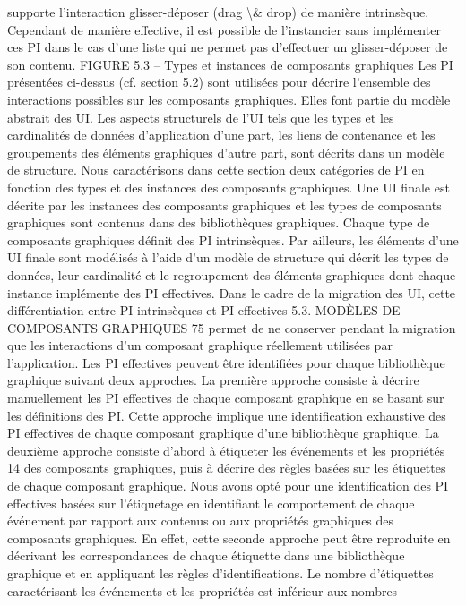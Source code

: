 \documentclass{article}
\begin{document}
supporte l’interaction glisser-d\'{e}poser (drag \textbackslash{}& drop) de mani\`{e}re intrins\`{e}que. Cependant de mani\`{e}re
effective, il est possible de l’instancier sans impl\'{e}menter ces PI dans le cas d’une liste qui ne permet
pas d’effectuer un glisser-d\'{e}poser de son contenu.
FIGURE 5.3 – Types et instances de composants graphiques
Les PI pr\'{e}sent\'{e}es ci-dessus (cf. section 5.2) sont utilis\'{e}es pour d\'{e}crire l’ensemble des interactions
possibles sur les composants graphiques. Elles font partie du mod\`{e}le abstrait des UI. Les aspects
structurels de l’UI tels que les types et les cardinalit\'{e}s de donn\'{e}es d’application d’une part, les liens
de contenance et les groupements des \'{e}l\'{e}ments graphiques d’autre part, sont d\'{e}crits dans un mod\`{e}le
de structure. Nous caract\'{e}risons dans cette section deux cat\'{e}gories de PI en fonction des types et
des instances des composants graphiques. Une UI ﬁnale est d\'{e}crite par les instances des composants
graphiques et les types de composants graphiques sont contenus dans des biblioth\`{e}ques graphiques.
Chaque type de composants graphiques d\'{e}ﬁnit des PI intrins\`{e}ques. Par ailleurs, les \'{e}l\'{e}ments d’une UI
ﬁnale sont mod\'{e}lis\'{e}s \`{a} l’aide d’un mod\`{e}le de structure qui d\'{e}crit les types de donn\'{e}es, leur cardinalit\'{e}
et le regroupement des \'{e}l\'{e}ments graphiques dont chaque instance impl\'{e}mente des PI effectives.
Dans le cadre de la migration des UI, cette diff\'{e}rentiation entre PI intrins\`{e}ques et PI effectives
5.3. MODÈLES DE COMPOSANTS GRAPHIQUES
75
permet de ne conserver pendant la migration que les interactions d’un composant graphique r\'{e}ellement
utilis\'{e}es par l’application.
Les PI effectives peuvent \^{e}tre identiﬁ\'{e}es pour chaque biblioth\`{e}que graphique suivant deux approches. La premi\`{e}re approche consiste \`{a} d\'{e}crire manuellement les PI effectives de chaque composant
graphique en se basant sur les d\'{e}ﬁnitions des PI. Cette approche implique une identiﬁcation exhaustive des PI effectives de chaque composant graphique d’une biblioth\`{e}que graphique. La deuxi\`{e}me
approche consiste d’abord \`{a} \'{e}tiqueter les \'{e}v\'{e}nements et les propri\'{e}t\'{e}s 14 des composants graphiques,
puis \`{a} d\'{e}crire des r\`{e}gles bas\'{e}es sur les \'{e}tiquettes de chaque composant graphique.
Nous avons opt\'{e} pour une identiﬁcation des PI effectives bas\'{e}es sur l’\'{e}tiquetage en identiﬁant le
comportement de chaque \'{e}v\'{e}nement par rapport aux contenus ou aux propri\'{e}t\'{e}s graphiques des composants graphiques. En effet, cette seconde approche peut \^{e}tre reproduite en d\'{e}crivant les correspondances de chaque \'{e}tiquette dans une biblioth\`{e}que graphique et en appliquant les r\`{e}gles d’identiﬁcations. Le nombre d’\'{e}tiquettes caract\'{e}risant les \'{e}v\'{e}nements et les propri\'{e}t\'{e}s est inf\'{e}rieur aux nombres
\end{document}
